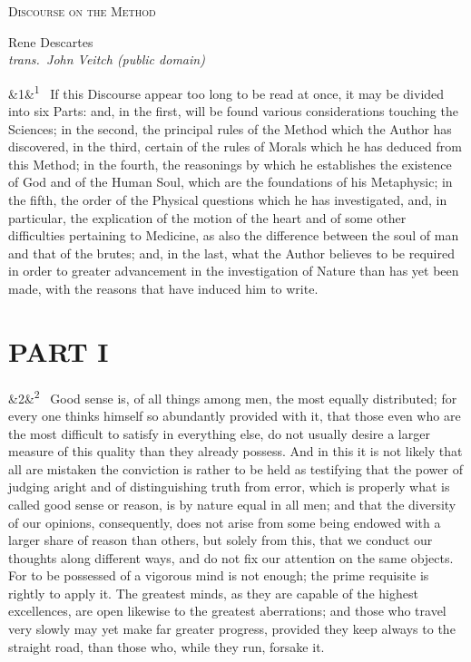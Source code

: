 \documentclass[12pt]{article}
\newcommand{\work}[1]{\begin{center}\LARGE\scshape #1\end{center}}
\newcommand{\attrib}[2]{\begin{center}\large #1\\[2pt]\small\itshape trans.\ #2\end{center}\vspace{1em}}
\newcommand{\para}[1][]{\par\noindent\ifx&#1&\else\textsuperscript{\footnotesize #1}~\fi}
\begin{document}
\work{Discourse on the Method}
\attrib{Rene Descartes}{John Veitch (public domain)}

\para[1] If this Discourse appear too long to be read at once, it may be divided into six Parts: and, in the first, will be found various considerations touching the Sciences; in the second, the principal rules of the Method which the Author has discovered, in the third, certain of the rules of Morals which he has deduced from this Method; in the fourth, the reasonings by which he establishes the existence of God and of the Human Soul, which are the foundations of his Metaphysic; in the fifth, the order of the Physical questions which he has investigated, and, in particular, the explication of the motion of the heart and of some other difficulties pertaining to Medicine, as also the difference between the soul of man and that of the brutes; and, in the last, what the Author believes to be required in order to greater advancement in the investigation of Nature than has yet been made, with the reasons that have induced him to write.

\section*{PART I}

\para[2] Good sense is, of all things among men, the most equally distributed; for every one thinks himself so abundantly provided with it, that those even who are the most difficult to satisfy in everything else, do not usually desire a larger measure of this quality than they already possess. And in this it is not likely that all are mistaken the conviction is rather to be held as testifying that the power of judging aright and of distinguishing truth from error, which is properly what is called good sense or reason, is by nature equal in all men; and that the diversity of our opinions, consequently, does not arise from some being endowed with a larger share of reason than others, but solely from this, that we conduct our thoughts along different ways, and do not fix our attention on the same objects. For to be possessed of a vigorous mind is not enough; the prime requisite is rightly to apply it. The greatest minds, as they are capable of the highest excellences, are open likewise to the greatest aberrations; and those who travel very slowly may yet make far greater progress, provided they keep always to the straight road, than those who, while they run, forsake it.
\end{document}
